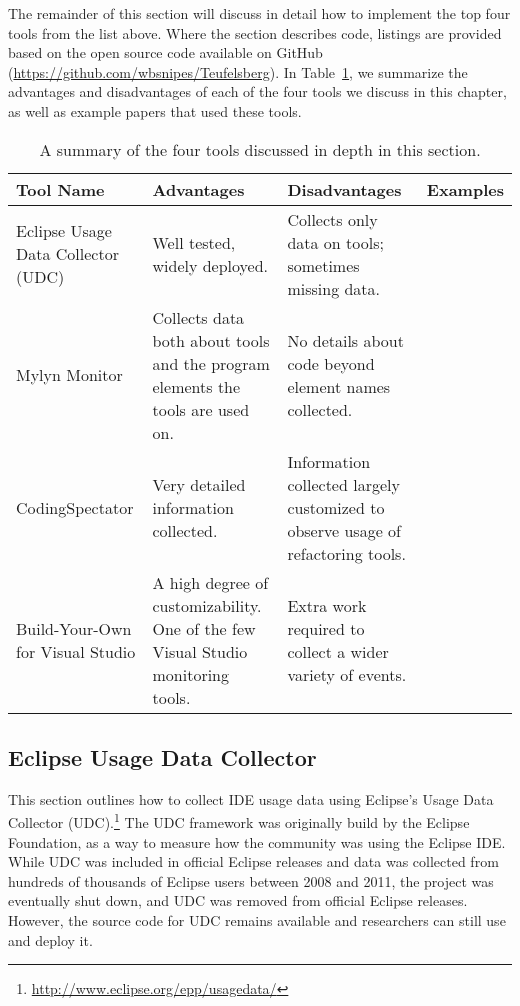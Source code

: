 
The remainder of this section will discuss in detail how to implement the top four tools from the list above.  Where the section describes code, listings are provided based on the open source code available on GitHub (\url{https://github.com/wbsnipes/Teufelsberg}). 
In Table~\ref{tab:toolsummary}, we summarize the advantages and disadvantages of each of the four tools we discuss in this chapter, as well as example papers that
used these tools.

\begin{table}
\renewcommand{\arraystretch}{1.5}
\begin{small}
\begin{tabular}{p{2cm}p{4cm}p{4cm}p{4cm}}
\textbf{Tool Name}&\textbf{Advantages}&\textbf{Disadvantages}&\textbf{Examples}\\
\hline
Eclipse Usage Data Collector (UDC)&Well tested, widely deployed.&Collects only data on tools; sometimes missing data.&\cite{liu2012initial,parnin2011resumption,murphy2012we}\\
Mylyn Monitor&Collects data both about tools and the program elements the tools are used on.&No details about code beyond element names collected.&\cite{Kersten-Mylyn,ying2011influence,murphy2009using}\\
CodingSpectator&Very detailed information collected.&Information collected largely customized to observe usage of refactoring tools.&\cite{VakilianETAL2011Richer,VakilianETAL2012UseDisuseMisuse,NegaraETAL2012Dangerous}\\
Build-Your-Own for Visual Studio&A high degree of customizability. One of the few Visual Studio monitoring tools.&Extra work required to collect a wider variety of events.&\cite{SnipesExperiencesGamifyingSoftwareDevelopment}\\
\end{tabular}
\end{small}
\caption{A summary of the four tools discussed in depth in this section.}\label{tab:toolsummary}
\end{table}

\subsection{Eclipse Usage Data Collector}
\label{EclipseUsageDataCollector}
This section outlines how to collect IDE usage data using Eclipse's Usage Data
Collector (UDC).\footnote{\url{http://www.eclipse.org/epp/usagedata/}}
The UDC framework was originally build by the Eclipse Foundation, as a way to measure how the
community was using the Eclipse IDE.
While UDC was included in official Eclipse releases and data was collected from
hundreds of thousands of Eclipse users between 2008 and 2011, the project was eventually shut down,
and UDC was removed from official Eclipse releases.
However, the source code for UDC remains available and researchers can still use and deploy it.

